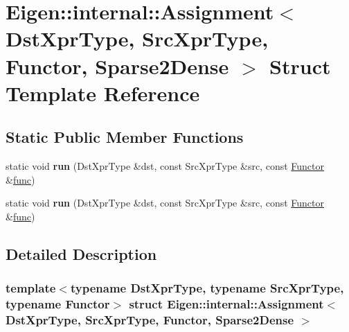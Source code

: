 \hypertarget{struct_eigen_1_1internal_1_1_assignment_3_01_dst_xpr_type_00_01_src_xpr_type_00_01_functor_00_01_sparse2_dense_01_4}{}\section{Eigen\+:\+:internal\+:\+:Assignment$<$ Dst\+Xpr\+Type, Src\+Xpr\+Type, Functor, Sparse2\+Dense $>$ Struct Template Reference}
\label{struct_eigen_1_1internal_1_1_assignment_3_01_dst_xpr_type_00_01_src_xpr_type_00_01_functor_00_01_sparse2_dense_01_4}
\subsection*{Static Public Member Functions}
\begin{DoxyCompactItemize}
\item 
\mbox{\label{struct_eigen_1_1internal_1_1_assignment_3_01_dst_xpr_type_00_01_src_xpr_type_00_01_functor_00_01_sparse2_dense_01_4_ab9b166c76885ff13090942424e88db79}} 
static void {\bfseries run} (Dst\+Xpr\+Type \&dst, const Src\+Xpr\+Type \&src, const \hyperlink{struct_functor}{Functor} \&\hyperlink{structfunc}{func})
\item 
\mbox{\label{struct_eigen_1_1internal_1_1_assignment_3_01_dst_xpr_type_00_01_src_xpr_type_00_01_functor_00_01_sparse2_dense_01_4_ab9b166c76885ff13090942424e88db79}} 
static void {\bfseries run} (Dst\+Xpr\+Type \&dst, const Src\+Xpr\+Type \&src, const \hyperlink{struct_functor}{Functor} \&\hyperlink{structfunc}{func})
\end{DoxyCompactItemize}


\subsection{Detailed Description}
\subsubsection*{template$<$typename Dst\+Xpr\+Type, typename Src\+Xpr\+Type, typename Functor$>$\newline
struct Eigen\+::internal\+::\+Assignment$<$ Dst\+Xpr\+Type, Src\+Xpr\+Type, Functor, Sparse2\+Dense $>$}



